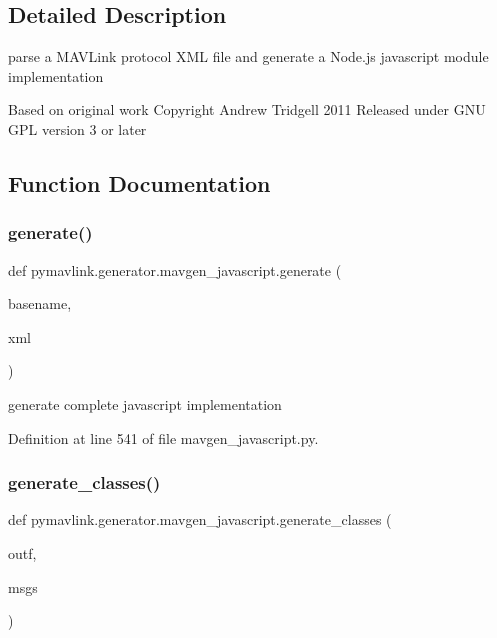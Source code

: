 \subsection{Detailed Description}
\begin{DoxyVerb}parse a MAVLink protocol XML file and generate a Node.js javascript module implementation

Based on original work Copyright Andrew Tridgell 2011
Released under GNU GPL version 3 or later
\end{DoxyVerb}
 

\subsection{Function Documentation}
\mbox{\label{namespacepymavlink_1_1generator_1_1mavgen__javascript_a91d9cd83428167ae922bb2bf9c97f811}} 
\subsubsection{\texorpdfstring{generate()}{generate()}}
{\footnotesize\ttfamily def pymavlink.\+generator.\+mavgen\+\_\+javascript.\+generate (\begin{DoxyParamCaption}\item[{}]{basename,  }\item[{}]{xml }\end{DoxyParamCaption})}

\begin{DoxyVerb}generate complete javascript implementation\end{DoxyVerb}
 

Definition at line 541 of file mavgen\+\_\+javascript.\+py.

\mbox{\label{namespacepymavlink_1_1generator_1_1mavgen__javascript_aa0aa15fc819656c01cf8decc8f7ace6a}} 
\subsubsection{\texorpdfstring{generate\_classes()}{generate\_classes()}}
{\footnotesize\ttfamily def pymavlink.\+generator.\+mavgen\+\_\+javascript.\+generate\+\_\+classes (\begin{DoxyParamCaption}\item[{}]{outf,  }\item[{}]{msgs }\end{DoxyParamCaption})}

